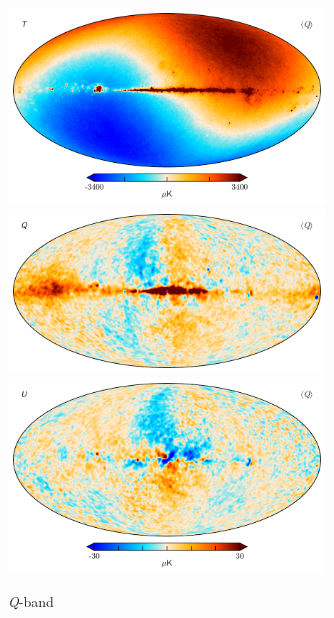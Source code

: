 \documentclass[twocolumn]{../../common/aa}
\newcommand{\Q}[0]{\textit Q}
\begin{document}
\begin{figure}
	\centering
	\includegraphics[width=0.75\textwidth]{figures/Q_mu_I.pdf}
	\includegraphics[width=0.75\textwidth]{figures/Q_mu_Q.pdf}
	\includegraphics[width=0.75\textwidth]{figures/Q_mu_U.pdf}
	\caption{\Q-band}
	\label{fig:qband}
\end{figure}
\end{document}
